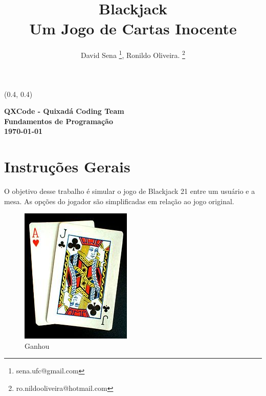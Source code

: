 \documentclass[12pt]{article}
\renewcommand{\bf}[1]{\textbf{#1}}
\begin{document}

\begin{textblock}{15}(0.4, 0.4)
\noindent
\begin{center}
\LARGE{\bf{QXCode - Quixadá Coding Team}}\\
\large{\bf{Fundamentos de Programação}} \\
\large{\bf{\today}}
\end{center}
\end{textblock}

\title{\bf{Blackjack \\ Um Jogo de Cartas Inocente}}

\author{
David Sena \thanks{sena.ufc@gmail.com}, 
Ronildo Oliveira. \thanks{ro.nildooliveira@hotmail.com}
}

\date{}

\maketitle
\thispagestyle{empty}



\section{Instruções Gerais}
O objetivo desse trabalho é simular o jogo de Blackjack 21 entre um usuário e a mesa. As opções do jogador são simplificadas em relação ao jogo original. 


\begin{figure}[hf]
\centering
\includegraphics[width=0.3\linewidth]{./imagens/blackjack}
\caption{Ganhou}
\end{figure}
\end{document}
